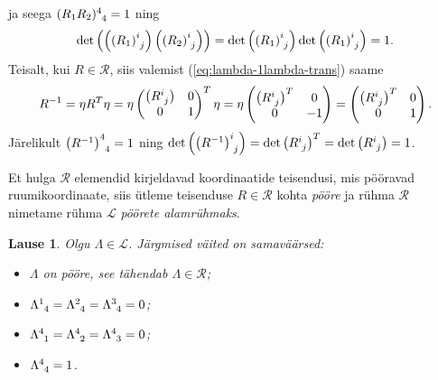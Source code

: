\documentclass[12pt,a4paper,oneside]{article}
\theoremstyle{plain}
\newtheorem{lause}{Lause}[section]
\theoremstyle{definition}
\numberwithin{equation}{section}
\def\L{{\mathcal L}}
\begin{document}
ja seega $(R_1 R_2)\indices{^4_4} = 1$ ning 
\[\det \left(\left(\left(R_1\right)\indices{^i_j}\right) 
\left(\left(R_2\right)\indices{^i_j}\right) \right) = 
\det \left(\left(R_1\right)\indices{^i_j}\right) \det 
\left(\left(R_1\right)\indices{^i_j}\right) = 1.\]
Teisalt, kui $R \in \mathcal{R}$, siis valemist 
(\ref{eq:lambda-1lambda-trans}) saame
\begin{align*}
R^{-1} = \eta R^T \eta = \eta \begin{pmatrix}
\left(R\indices{^i_j}\right) & 0 \\ 
0 & 1 \\ \end{pmatrix}^T \eta = 
\eta \begin{pmatrix}
\left(R\indices{^i_j}\right)^T & 0 \\ 
0 & -1 \\ \end{pmatrix} = \begin{pmatrix}
\left(R\indices{^i_j}\right)^T & 0 \\ 
0 & 1 \\ \end{pmatrix}.
\end{align*}
Järelikult $\left(R^{-1}\right)\indices{^4_4} = 1$ ning 
$\det \left(\left(R^{-1}\right)\indices{^i_j}\right) = 
\det \left(R\indices{^i_j}\right)^T = \det 
\left(R\indices{^i_j}\right) = 1$.

Et hulga $\mathcal{R}$ elemendid kirjeldavad koordinaatide 
teisendusi, mis pööravad ruumikoordinaate, siis ütleme teisenduse 
$R \in \mathcal{R}$ kohta \emph{pööre} ja rühma $\mathcal{R}$ 
nimetame rühma $\L$ \emph{pöörete alamrühmaks}.

\begin{lause} \label{lause:rotation}
Olgu $\Lambda \in \L$. Järgmised väited on samaväärsed:
\begin{itemize}
\item[\emph{(i)}] $\Lambda$ on pööre, see tähendab $\Lambda \in 
\mathcal{R}$;
\item[\emph{(ii)}] $\Lambda\indices{^1_4} = \Lambda\indices{^2_4} = 
\Lambda\indices{^3_4} = 0$;
\item[\emph{(iii)}] $\Lambda\indices{^4_1} = \Lambda\indices{^4_2} = 
\Lambda\indices{^4_3} = 0$;
\item[\emph{(iv)}] $\Lambda\indices{^4_4} = 1$.
\end{itemize}
\end{lause}
\end{document}
